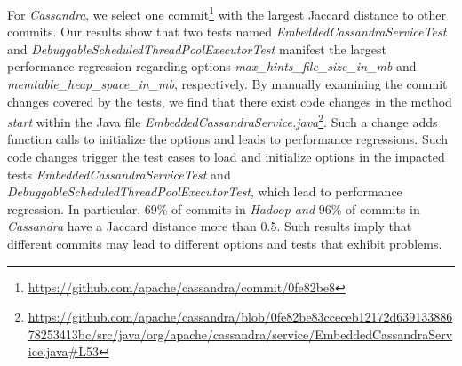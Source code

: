 For \emph{Cassandra}, we select one commit\footnote{\url{https://github.com/apache/cassandra/commit/0fe82be8}} with the largest Jaccard distance to other commits. Our results show that two tests named \emph{EmbeddedCassandraServiceTest} and \emph{DebuggableScheduledThreadPoolExecutorTest} manifest the largest performance regression regarding options \emph{max\_hints\_file\_size\_in\_mb} and \emph{memtable\_heap\_space\_in\_mb}, respectively. By manually examining the commit changes covered by the tests, we find that there exist code changes in the method \emph{start} within the Java file \emph{EmbeddedCassandraService.java}\footnote{\url{https://github.com/apache/cassandra/blob/0fe82be83cceceb12172d63913388678253413bc/src/java/org/apache/cassandra/service/EmbeddedCassandraService.java\#L53}}. Such a change adds function calls to initialize the options and leads to performance regressions. Such code changes trigger the test cases to load and initialize options in the impacted tests \emph{EmbeddedCassandraServiceTest} and \emph{DebuggableScheduledThreadPoolExecutorTest}, which lead to performance regression. %
In particular, 69\% of commits in \emph{Hadoop and }96\% of commits in \emph{Cassandra} have a Jaccard distance more than 0.5. Such results imply that different commits may lead to different options and tests that exhibit \inconsistent problems. %






